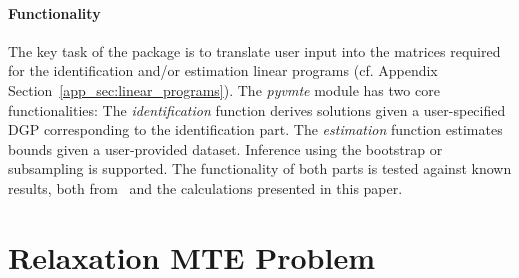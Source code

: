 \documentclass[12pt,a4paper,english]{article} %
\numberwithin{equation}{section}
\theoremstyle{definition}
\theoremstyle{remark}
\theoremstyle{plain}
\begin{document}
\paragraph{Functionality}
The key task of the package is to translate user input into the matrices required for the identification and/or estimation linear programs (cf. Appendix Section~\ref{app_sec:linear_programs}).
The \textit{pyvmte} module has two core functionalities:
The \textit{identification} function derives solutions given a user-specified DGP corresponding to the identification part.
The \textit{estimation} function estimates bounds given a user-provided dataset. Inference using the bootstrap or subsampling is supported.
The functionality of both parts is tested against known results, both from~\cite{mogstad2018using} and the calculations presented in this paper.

\clearpage
\newpage

\section{Relaxation MTE Problem}
\end{document}
